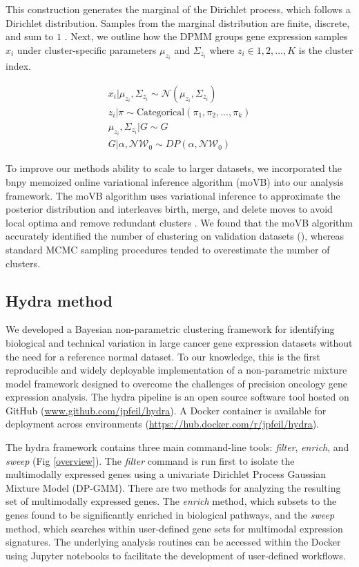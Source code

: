 \documentclass[10pt,letterpaper]{article}
\begin{document}
This construction generates the marginal of the Dirichlet process, which follows a Dirichlet distribution. Samples from the marginal distribution are finite, discrete, and sum to $1$ \cite{fergusonBayesianAnalysisNonparametric1973}. Next, we outline how the DPMM groups gene expression samples $x_i$ under cluster-specific parameters $\mu_{z_i}$ and $\Sigma_{z_i}$ where $z_i \in {1, 2, ..., K}$ is the cluster index.

\begin{gather}
\label{eq:mm}
x_i | \mu_{z_i}, \Sigma_{z_i} \sim \mathcal{N}(\mu_{z_i}, \Sigma_{z_i}) \\
z_i | \pi \sim \text{Categorical}(\pi_1, \pi_2, ..., \pi_k) \\
\mu_{z_i}, \Sigma_{z_i} | G \sim G \\
G | \alpha, \mathcal{NW}_0 \sim DP(\alpha, \mathcal{NW}_0)
\end{gather}

To improve our methods ability to scale to larger datasets, we incorporated the bnpy memoized online variational inference algorithm (moVB) \cite{hughes2013memoized} into our analysis framework. The moVB algorithm uses variational inference to approximate the posterior distribution and interleaves birth, merge, and delete moves to avoid local optima and remove redundant clusters \cite{hughesBnpyReliableScalable}. We found that the moVB algorithm accurately identified the number of clustering on validation datasets (), whereas standard MCMC sampling procedures tended to overestimate the number of clusters.

\subsection*{Hydra method}
We developed a Bayesian non-parametric clustering framework for identifying biological and technical variation in large cancer gene expression datasets without the need for a reference normal dataset. To our knowledge, this is the first reproducible and widely deployable implementation of a non-parametric mixture model framework designed to overcome the challenges of precision oncology gene expression analysis. The hydra pipeline is an open source software tool hosted on GitHub (\url{www.github.com/jpfeil/hydra}). A Docker container is available for deployment across environments (\url{https://hub.docker.com/r/jpfeil/hydra}).

The hydra framework contains three main command-line tools: \textit{filter}, \textit{enrich}, and \textit{sweep} (Fig \ref{overview}). The \textit{filter} command is run first to isolate the multimodally expressed genes using a univariate Dirichlet Process Gaussian Mixture Model (DP-GMM). There are two methods for analyzing the resulting set of multimodally expressed genes. The \textit{enrich} method, which subsets to the genes found to be significantly enriched in biological pathways, and the \textit{sweep} method, which searches within user-defined gene sets for multimodal expression signatures. The underlying analysis routines can be accessed within the Docker using Jupyter notebooks to facilitate the development of user-defined workflows.
\end{document}
